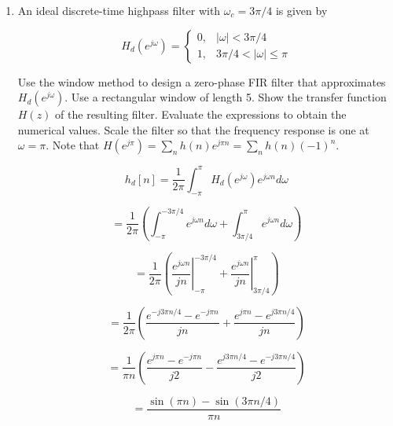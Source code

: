 \documentclass[fleqn]{article}
\begin{document}
\begin{enumerate}[nolistsep]
		\item An ideal discrete-time highpass filter with $\omega_c = 3\pi/4$ is given by
		
		\begin{equation*}
			H_d(e^{j\omega}) = 
			\begin{cases}
				0, & |\omega| < 3\pi/4 \\
				1, & 3\pi/4 < |\omega| \leq \pi
			\end{cases}
		\end{equation*}
		
		Use the window method to design a zero-phase FIR filter that approximates $H_d(e^{j\omega})$. Use a rectangular window of length 5. Show the transfer function $H(z)$ of the resulting filter. Evaluate the expressions to obtain the numerical values. Scale the filter so that the frequency response is one at $\omega = \pi$. Note that $H(e^{j\pi}) = \sum_{n}{h(n)e^{j{\pi}n}} = \sum_{n}{h(n)(-1)^n}$.
		
		\begin{equation*}
			h_d[n] = \frac{1}{2\pi}\int_{-\pi}^{\pi}{H_d(e^{j\omega})e^{j{\omega}n}}d\omega
		\end{equation*}
		
		\begin{equation*}
			= \frac{1}{2\pi}\left(\int_{-\pi}^{-3\pi/4}{e^{j{\omega}n}d\omega} + \int_{3\pi/4}^{\pi}{e^{j{\omega}n}d\omega}\right)
		\end{equation*}
		
		\begin{equation*}
			= \frac{1}{2\pi}\left(\left.\frac{e^{j{\omega}n}}{jn}\right\vert_{-\pi}^{-3\pi/4} + \left.\frac{e^{j{\omega}n}}{jn}\right\vert_{3\pi/4}^{\pi}\right)
		\end{equation*}
		
		\begin{equation*}
			= \frac{1}{2\pi}\left(\frac{e^{-j3{\pi}n/4} - e^{-j{\pi}n}}{jn} + \frac{e^{j{\pi}n} - e^{j3{\pi}n/4}}{jn}\right)
		\end{equation*}
		
		\begin{equation*}
			= \frac{1}{{\pi}n}\left(\frac{e^{j{\pi}n} - e^{-j{\pi}n}}{j2} - \frac{e^{j3{\pi}n/4} - e^{-j3{\pi}n/4}}{j2}\right)
		\end{equation*}
		
		\begin{equation*}
			= \frac{\sin{({\pi}n)} - \sin{(3{\pi}n/4)}}{{\pi}n}
		\end{equation*}
	\end{enumerate}
\end{document}
